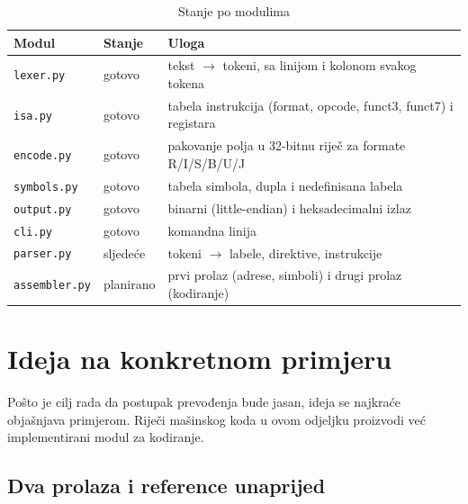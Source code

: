 \documentclass[11pt,a4paper]{article}
\newcommand{\kod}[1]{\texttt{#1}}
\begin{document}
\begin{table}[h]
  \centering
  \caption{Stanje po modulima}
  \begin{tabularx}{0.9\textwidth}{@{}llX@{}}
    \toprule
    \textbf{Modul} & \textbf{Stanje} & \textbf{Uloga} \\
    \midrule
    \kod{lexer.py}    & gotovo   & tekst $\rightarrow$ tokeni, sa linijom i kolonom svakog tokena \\
    \kod{isa.py}      & gotovo   & tabela instrukcija (format, opcode, funct3, funct7) i registara \\
    \kod{encode.py}   & gotovo   & pakovanje polja u 32-bitnu riječ za formate R/I/S/B/U/J \\
    \kod{symbols.py}  & gotovo   & tabela simbola, dupla i nedefinisana labela \\
    \kod{output.py}   & gotovo   & binarni (little-endian) i heksadecimalni izlaz \\
    \kod{cli.py}      & gotovo   & komandna linija \\
    \kod{parser.py}   & sljedeće & tokeni $\rightarrow$ labele, direktive, instrukcije \\
    \kod{assembler.py}& planirano& prvi prolaz (adrese, simboli) i drugi prolaz (kodiranje) \\
    \bottomrule
  \end{tabularx}
\end{table}

\section{Ideja na konkretnom primjeru}

Pošto je cilj rada da postupak prevođenja bude jasan, ideja se najkraće objašnjava primjerom.
Riječi mašinskog koda u ovom odjeljku proizvodi već implementirani modul za kodiranje.

\subsection{Dva prolaza i reference unaprijed}
\end{document}
